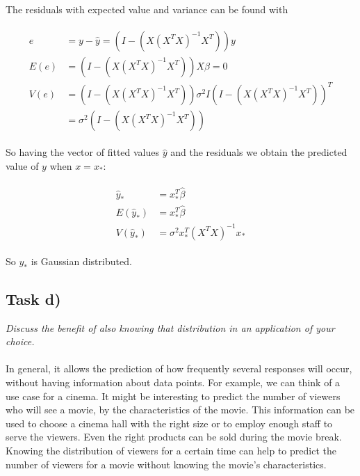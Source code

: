 \documentclass{article}
\begin{document}
The residuals with expected value and variance can be found with

\begin{align}
\begin{aligned}
e &= y - \hat y = (I - (X (X^TX)^{-1}X^T))y\\
E(e) &=(I - (X (X^TX)^{-1}X^T))X\beta = 0\\
V(e) &= (I - (X (X^TX)^{-1}X^T))\sigma^2 I (I - (X (X^TX)^{-1}X^T))^T \\
       &= \sigma^2(I - (X (X^TX)^{-1}X^T))
\end{aligned}
\end{align}

So having the vector of fitted values $\hat y$ and the residuals we obtain the predicted value of $y$ when $x=x_*$:

\begin{align}
\begin{aligned}
\hat y_* &= x_*^T \hat\beta\\
E(\hat y_*) &= x_*^T\hat \beta\\
V(\hat y_*) &= \sigma^2 x_*^T (X^TX)^{-1}x_*
\end{aligned}
\end{align}

So $y_*$ is Gaussian distributed.

\subsection*{Task d)}
\textit{Discuss the benefit of also knowing that distribution in an application of your choice.}\\
\\
In general, it allows the prediction of how frequently several responses will occur, without having information about data points. For example, we can think of a use case for a cinema. It might be interesting to predict the number of viewers who will see a movie, by the characteristics of the movie. This information can be used to choose a cinema hall with the right size or to employ enough staff to serve the viewers. Even the right products can be sold during the movie break. Knowing the distribution of viewers for a certain time can help to predict the number of viewers for a movie without knowing the movie's characteristics.

\end{document}
